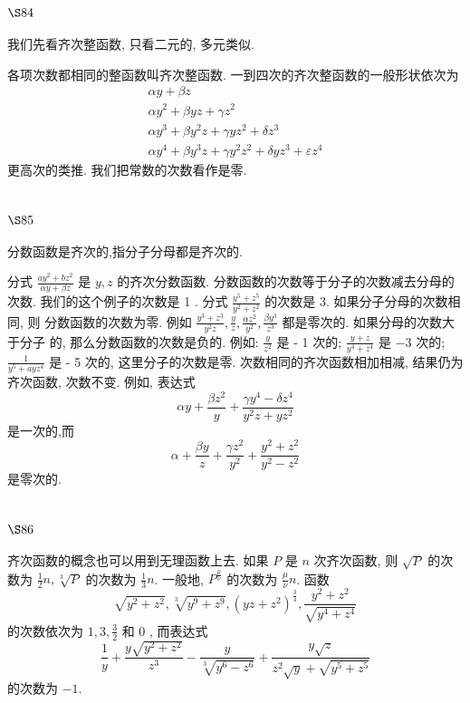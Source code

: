 \section{$\S 84$}

我们先看齐次整函数, 只看二元的, 多元类似.

各项次数都相同的整函数叫齐次整函数. 一到四次的齐次整函数的一般形状依次为
\[
\begin{gathered}
\alpha y+\beta z \\
\alpha y^{2}+\beta y z+\gamma z^{2} \\
\alpha y^{3}+\beta y^{2} z+\gamma y z^{2}+\delta z^{3} \\
\alpha y^{4}+\beta y^{3} z+\gamma y^{2} z^{2}+\delta y z^{3}+\varepsilon z^{4}
\end{gathered}
\]
更高次的类推. 我们把常数的次数看作是零.

\section{$\S 85$}

分数函数是齐次的,指分子分母都是齐次的.

分式 $\frac{a y^{2}+b z^{2}}{\alpha y+\beta z}$ 是 $y, z$ 的齐次分数函数. 分数函数的次数等于分子的次数减去分母的 次数. 我们的这个例子的次数是 1 . 分式 $\frac{y^{5}+z^{5}}{y^{2}+z^{2}}$ 的次数是 3. 如果分子分母的次数相同, 则 分数函数的次数为零. 例如 $\frac{y^{3}+z^{3}}{y^{2} z}, \frac{y}{z}, \frac{\alpha z^{2}}{y^{2}}, \frac{\beta y^{3}}{z^{3}}$ 都是零次的. 如果分母的次数大于分子 的, 那么分数函数的次数是负的. 例如: $\frac{y}{z^{2}}$ 是 - 1 次的; $\frac{y+z}{y^{4}+z^{4}}$ 是 $-3$ 次的; $\frac{1}{y^{5}+a y z^{4}}$ 是 - 5 次的, 这里分子的次数是零. 次数相同的齐次函数相加相减, 结果仍为齐次函数, 次数不变. 例如, 表达式
\[
\alpha y+\frac{\beta z^{2}}{y}+\frac{\gamma y^{4}-\delta z^{4}}{y^{2} z+y z^{2}}
\]
是一次的,而
\[
\alpha+\frac{\beta y}{z}+\frac{\gamma z^{2}}{y^{2}}+\frac{y^{2}+z^{2}}{y^{2}-z^{2}}
\]
是零次的.

\section{$\S 86$}

齐次函数的概念也可以用到无理函数上去. 如果 $P$ 是 $n$ 次齐次函数, 则 $\sqrt{P}$ 的次数为 $\frac{1}{2} n, \sqrt[3]{P}$ 的次数为 $\frac{1}{3} n$. 一般地, $P^{\frac{\mu}{\nu}}$ 的次数为 $\frac{\mu}{\nu} n$. 函数
\[
\sqrt{y^{2}+z^{2}}, \sqrt[3]{y^{9}+z^{9}},\left(y z+z^{2}\right)^{\frac{3}{4}}, \frac{y^{2}+z^{2}}{\sqrt{y^{4}+z^{4}}}
\]
的次数依次为 $1,3, \frac{3}{2}$ 和 0 , 而表达式
\[
\frac{1}{y}+\frac{y \sqrt{y^{2}+z^{2}}}{z^{3}}-\frac{y}{\sqrt[3]{y^{6}-z^{6}}}+\frac{y \sqrt{z}}{z^{2} \sqrt{y}+\sqrt{y^{5}+z^{5}}}
\]
的次数为 $-1$.

